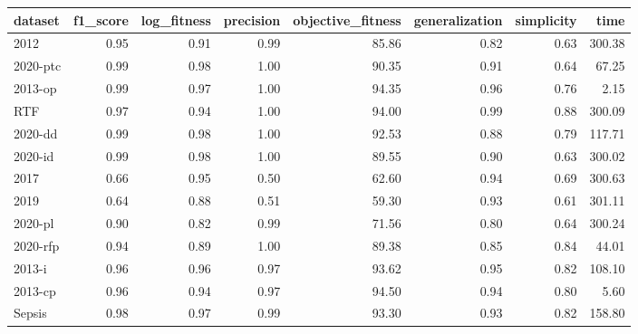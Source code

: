 \begin{tabular}{lrrrrrrr}
\toprule
dataset & f1_score & log_fitness & precision & objective_fitness & generalization & simplicity & time \\
\midrule
2012 & 0.95 & 0.91 & 0.99 & 85.86 & 0.82 & 0.63 & 300.38 \\
2020-ptc & 0.99 & 0.98 & 1.00 & 90.35 & 0.91 & 0.64 & 67.25 \\
2013-op & 0.99 & 0.97 & 1.00 & 94.35 & 0.96 & 0.76 & 2.15 \\
RTF & 0.97 & 0.94 & 1.00 & 94.00 & 0.99 & 0.88 & 300.09 \\
2020-dd & 0.99 & 0.98 & 1.00 & 92.53 & 0.88 & 0.79 & 117.71 \\
2020-id & 0.99 & 0.98 & 1.00 & 89.55 & 0.90 & 0.63 & 300.02 \\
2017 & 0.66 & 0.95 & 0.50 & 62.60 & 0.94 & 0.69 & 300.63 \\
2019 & 0.64 & 0.88 & 0.51 & 59.30 & 0.93 & 0.61 & 301.11 \\
2020-pl & 0.90 & 0.82 & 0.99 & 71.56 & 0.80 & 0.64 & 300.24 \\
2020-rfp & 0.94 & 0.89 & 1.00 & 89.38 & 0.85 & 0.84 & 44.01 \\
2013-i & 0.96 & 0.96 & 0.97 & 93.62 & 0.95 & 0.82 & 108.10 \\
2013-cp & 0.96 & 0.94 & 0.97 & 94.50 & 0.94 & 0.80 & 5.60 \\
Sepsis & 0.98 & 0.97 & 0.99 & 93.30 & 0.93 & 0.82 & 158.80 \\
\bottomrule
\end{tabular}
